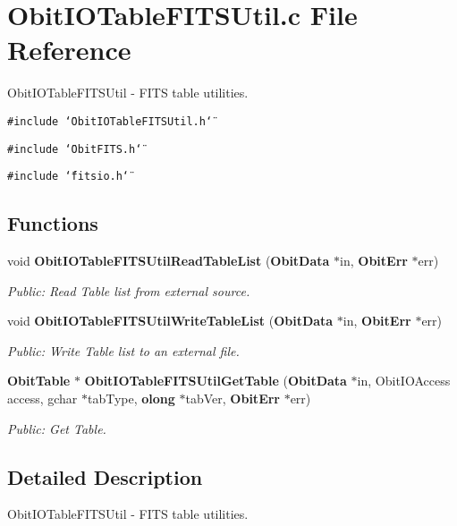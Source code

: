 \section{Obit\-IOTable\-FITSUtil.c File Reference}
\label{ObitIOTableFITSUtil_8c}
Obit\-IOTable\-FITSUtil - FITS table utilities. 

{\tt \#include \char`\"{}Obit\-IOTable\-FITSUtil.h\char`\"{}}\par
{\tt \#include \char`\"{}Obit\-FITS.h\char`\"{}}\par
{\tt \#include \char`\"{}fitsio.h\char`\"{}}\par
\subsection*{Functions}
\begin{CompactItemize}
\item 
void {\bf Obit\-IOTable\-FITSUtil\-Read\-Table\-List} ({\bf Obit\-Data} $\ast$in, {\bf Obit\-Err} $\ast$err)
\begin{CompactList}\small\item\em Public: Read Table list from external source. \item\end{CompactList}\item 
void {\bf Obit\-IOTable\-FITSUtil\-Write\-Table\-List} ({\bf Obit\-Data} $\ast$in, {\bf Obit\-Err} $\ast$err)
\begin{CompactList}\small\item\em Public: Write Table list to an external file. \item\end{CompactList}\item 
{\bf Obit\-Table} $\ast$ {\bf Obit\-IOTable\-FITSUtil\-Get\-Table} ({\bf Obit\-Data} $\ast$in, Obit\-IOAccess access, gchar $\ast$tab\-Type, {\bf olong} $\ast$tab\-Ver, {\bf Obit\-Err} $\ast$err)
\begin{CompactList}\small\item\em Public: Get Table. \item\end{CompactList}\end{CompactItemize}


\subsection{Detailed Description}
Obit\-IOTable\-FITSUtil - FITS table utilities. 



